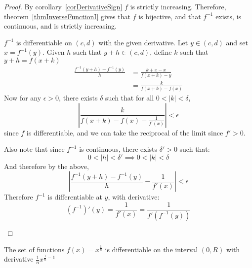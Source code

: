 \documentclass[../Main.tex]{subfiles}
\begin{document}
\begin{proof}
    By corollary~\ref{corDerivativeSign} $f$ is strictly increasing. Therefore, theorem~\ref{thmInverseFunctionI} gives that $f$ is bijective, and that $f^{-1}$ exists, is continuous, and is strictly increasing.
    \begin{subproof}{$f^{-1}$ is differentiable on $(c, d)$ with the given derivative.}
        Let $y \in (c, d)$ and set $x = f^{-1}(y)$. Given $h$ such that $y + h \in (c, d)$, define $k$ such that $y + h = f(x + k)$
        \begin{align*}
            \frac{f^{-1}(y + h) - f^{-1}(y)}{h} &= \frac{k + x - x}{f(x + k) - y} \\
            &= \frac{k}{f(x + k) - f(x)}
        \end{align*}
        Now for any $\epsilon > 0$, there exists $\delta$ such that for all $0 < |k| < \delta$,
        \begin{equation*}
            \left|\frac{k}{f(x + k) - f(x) - \frac{1}{f'(x)}}\right| < \epsilon
        \end{equation*}
        since $f$ is differentiable, and we can take the reciprocal of the limit since $f' > 0$.

        Also note that since $f^{-1}$ is continuous, there exists $\delta' > 0$ such that:
        \begin{equation*}
            0 < |h| < \delta' \implies 0 < |k| < \delta
        \end{equation*}
        And therefore by the above,
        \begin{equation*}
            \left|\frac{f^{-1}(y + h) - f^{-1}(y)}{h} - \frac{1}{f'(x)}\right| < \epsilon
        \end{equation*}
        Therefore $f^{-1}$ is differentiable at $y$, with derivative:
        \begin{equation*}
            (f^{-1})'(y) = \frac{1}{f'(x)} = \frac{1}{f'(f^{-1}(y))}
        \end{equation*}
    \end{subproof}
\end{proof}
\begin{corollary}
    The set of functions $f(x) = x^{\frac{1}{n}}$ is differentiable on the interval $(0, R)$ with derivative $\frac{1}{n} x^{\frac{1}{n} - 1}$
    \label{corNthRootDiffable}
\end{corollary}
\end{document}
